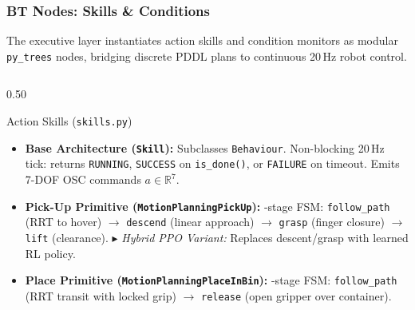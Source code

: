 \documentclass[10pt]{beamer}
\begin{document}
\begin{frame}[t]
\frametitle{BT Nodes: Skills \& Conditions}
\footnotesize
The executive layer instantiates action skills and condition monitors as modular \texttt{py\_trees} nodes, bridging discrete PDDL plans to continuous 20\,Hz robot control.

\vspace{0.04cm}
\begin{columns}[T]
    \begin{column}{0.50\textwidth}
        \begin{block}{Action Skills (\texttt{skills.py})}
            \begin{itemize}\scriptsize
                \setlength\itemsep{0.12em}
                \item \textbf{Base Architecture (\texttt{Skill}):}
                \newline Subclasses \texttt{Behaviour}. Non-blocking 20\,Hz tick: returns \texttt{RUNNING}, \texttt{SUCCESS} on \texttt{is\_done()}, or \texttt{FAILURE} on timeout. Emits 7-DOF OSC commands $a \in \mathbb{R}^7$.
                \item \textbf{Pick-Up Primitive (\texttt{MotionPlanningPickUp}):}
                -stage FSM: \texttt{follow\_path} (RRT to hover) $\to$ \texttt{descend} (linear approach) $\to$ \texttt{grasp} (finger closure) $\to$ \texttt{lift} (clearance).
                \newline $\blacktriangleright$ \textit{Hybrid PPO Variant:} Replaces descent/grasp with learned RL policy.
                \item \textbf{Place Primitive (\texttt{MotionPlanningPlaceInBin}):}
                -stage FSM: \texttt{follow\_path} (RRT transit with locked grip) $\to$ \texttt{release} (open gripper over container).
            \end{itemize}
        \end{block}
    \end{column}


\end{columns}
\end{frame}
\end{document}
